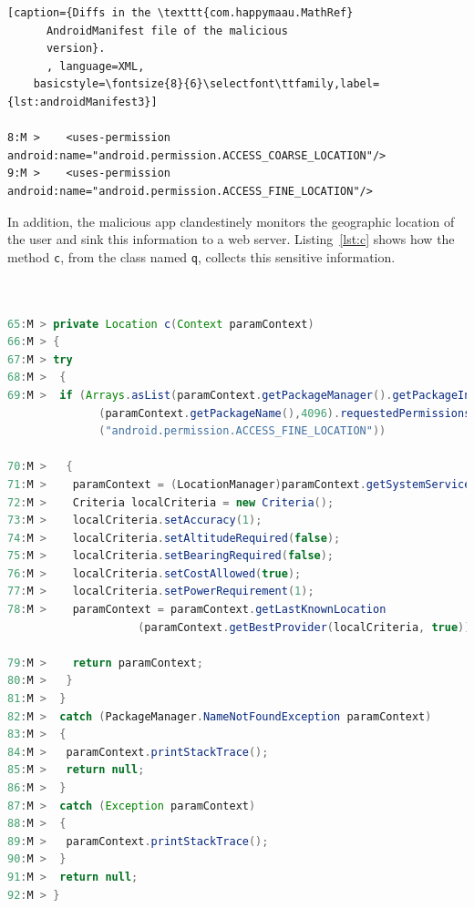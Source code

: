 \begin{lstlisting}[caption={Diffs in the \texttt{com.happymaau.MathRef}
      AndroidManifest file of the malicious
      version}.
      , language=XML,
    basicstyle=\fontsize{8}{6}\selectfont\ttfamily,label={lst:androidManifest3}]

8:M >    <uses-permission android:name="android.permission.ACCESS_COARSE_LOCATION"/>
9:M >    <uses-permission android:name="android.permission.ACCESS_FINE_LOCATION"/>
\end{lstlisting}

In addition, the malicious app clandestinely monitors the geographic location of the user and sink
this information to a web server. Listing~\ref{lst:c} shows how
the method \texttt{c}, from the class named \texttt{q}, collects this sensitive information. 

\begin{lstlisting}[caption={Diffs in the malicious version
      of the class \texttt{net.crazymedia.iad.d.q}
      (app \texttt{ru.qixi.android.smartrabbits})},
      language=Java, basicstyle=\fontsize{8}{6}\selectfont\ttfamily,
      label={lst:c}]


65:M > private Location c(Context paramContext)
66:M > {
67:M > try
68:M >  {
69:M >  if (Arrays.asList(paramContext.getPackageManager().getPackageInfo
              (paramContext.getPackageName(),4096).requestedPermissions).contains
              ("android.permission.ACCESS_FINE_LOCATION"))

70:M >   {
71:M >    paramContext = (LocationManager)paramContext.getSystemService("location");
72:M >    Criteria localCriteria = new Criteria();
73:M >    localCriteria.setAccuracy(1);
74:M >    localCriteria.setAltitudeRequired(false);
75:M >    localCriteria.setBearingRequired(false);
76:M >    localCriteria.setCostAllowed(true);
77:M >    localCriteria.setPowerRequirement(1);
78:M >    paramContext = paramContext.getLastKnownLocation
                    (paramContext.getBestProvider(localCriteria, true));
                    
79:M >    return paramContext;
80:M >   }
81:M >  }
82:M >  catch (PackageManager.NameNotFoundException paramContext)
83:M >  {
84:M >   paramContext.printStackTrace();
85:M >   return null;
86:M >  }
87:M >  catch (Exception paramContext)
88:M >  {
89:M >   paramContext.printStackTrace();
90:M >  }
91:M >  return null;
92:M > }
\end{lstlisting}

